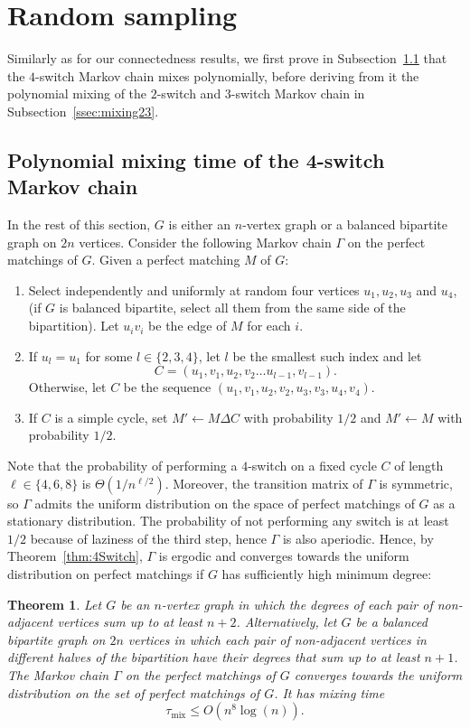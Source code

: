 \documentclass[11pt,a4paper]{article}
\newtheorem{theorem}{Theorem}[section]
\theoremstyle{definition}
\DeclareMathOperator{\mix}{mix}
\begin{document}
\section{Random sampling}\label{sec:random_sampling}
Similarly as for our connectedness results, we first prove in
Subsection~\ref{ssec:mixing4} that the $4$-switch Markov chain mixes polynomially, before
deriving from it the polynomial mixing of the $2$-switch and $3$-switch Markov
chain in Subsection~\ref{ssec:mixing23}. 

\subsection{Polynomial mixing time of the 4-switch Markov chain}\label{ssec:mixing4}
In the rest of this section, $G$ is either an $n$-vertex graph or a balanced
bipartite graph on $2n$ vertices. Consider the following Markov chain $\Gamma$
on the perfect matchings of $G$. Given a perfect matching $M$ of $G$:
\begin{enumerate}
\item Select independently and uniformly at random four vertices $u_1,u_2, u_3$
  and $u_4$, (if $G$ is balanced bipartite, select all them from the same side of the
  bipartition). Let $u_iv_i$ be the edge of $M$ for each $i$.
\item If $u_l = u_1$ for some $l \in \{2,3,4\}$, let $l$ be the smallest such
  index and let \[C = (u_1, v_1, u_2, v_2 \dots u_{l-1}, v_{l-1}).\] Otherwise, let
  $C$ be the sequence $(u_1, v_1, u_2, v_2, u_3, v_3, u_4, v_4)$.
\item If $C$ is a simple cycle, set $M' \leftarrow M \Delta C$ with probability
  $1/2$ and $M' \leftarrow M$ with probability $1/2$.
\end{enumerate}

Note that the probability of performing a $4$-switch on a fixed cycle $C$ of
length $\ell \in \{4,6,8\}$ is $\Theta(1/n^{\ell/2})$. Moreover, the transition
matrix of $\Gamma$ is symmetric, so $\Gamma$ admits the uniform distribution on
the space of perfect matchings of $G$ as a stationary distribution. The
probability of not performing any switch is at least $1/2$ because of laziness
of the third step, hence $\Gamma$ is also aperiodic. Hence, by
Theorem~\ref{thm:4Switch}, $\Gamma$ is ergodic and converges towards the uniform
distribution on perfect matchings if $G$ has sufficiently high minimum degree:

\begin{theorem}\label{thm:mixing}
  Let $G$ be an $n$-vertex graph in which the degrees of each pair of non-adjacent
  vertices sum up to at least $n+2$. 
  Alternatively, let $G$ be a balanced bipartite graph on $2n$ vertices in which
  each pair of non-adjacent vertices in different halves of the bipartition  have
  their degrees that sum up to at least $n+1$.\\
  The Markov chain $\Gamma$ on the perfect matchings of $G$ converges towards
  the uniform distribution on the set of perfect matchings of $G$. It has mixing
  time
  $$\tau_{\mix} \le O(n^8\log(n)).$$
\end{theorem}
\end{document}
